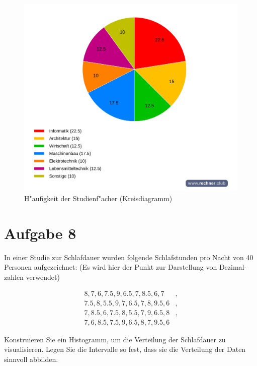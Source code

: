 \documentclass[10pt, a4paper, oneside]{article}
\begin{document}
\begin{enumerate}[1.]
    \begin{figure}[!h]
        \centering
        \includegraphics[width=1\textwidth]{./assets/Kreisdiagramm-01.png}
        \caption{H"aufigkeit der Studienf"acher (Kreisdiagramm)}
    \end{figure}
    \pagebreak

\end{enumerate}

\section{Aufgabe 8}

In einer Studie zur Schlafdauer wurden folgende Schlafstunden pro Nacht von 40
Personen aufgezeichnet: (Es wird hier der Punkt zur Darstellung von Dezimal-
zahlen verwendet)

\begin{align*}
       8, 7, 6, 7.5, 9, 6.5, 7, 8.5, 6, 7&,\\
     7.5, 8, 5.5, 9, 7, 6.5, 7, 8, 9.5, 6&,\\
     7, 8.5, 6, 7.5, 8, 5.5, 7, 9, 6.5, 8&,\\
     7, 6, 8.5, 7.5, 9, 6.5, 8, 7, 9.5, 6&
\end{align*}

Konstruieren Sie ein Histogramm, um die Verteilung der Schlafdauer zu
visualisieren. Legen Sie die Intervalle so fest, dass sie die Verteilung der
Daten sinnvoll abbilden.
\end{document}
